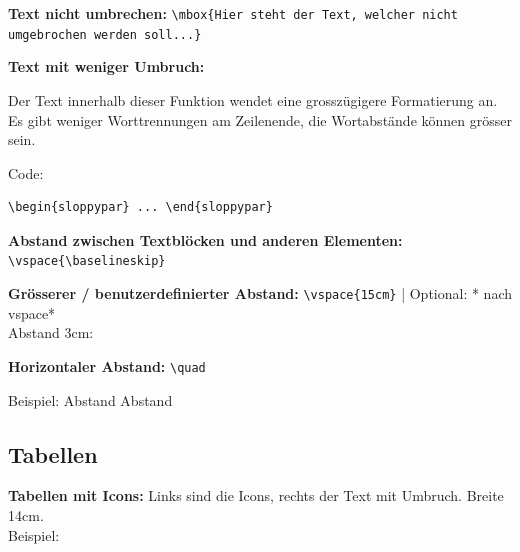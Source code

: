 \vspace{\baselineskip}

\textbf{Text nicht umbrechen:}
\verb+\mbox{Hier steht der Text, welcher nicht umgebrochen werden soll...}+

\vspace{\baselineskip}

\textbf{Text mit weniger Umbruch:}

Der Text innerhalb dieser Funktion wendet eine grosszügigere Formatierung an. Es gibt weniger Worttrennungen am Zeilenende, die Wortabstände können grösser sein.

Code:

\begin{verbatim}
\begin{sloppypar} ... \end{sloppypar}
\end{verbatim}

\vspace{\baselineskip}

\textbf{Abstand zwischen Textblöcken und anderen Elementen:}\\
\verb+\vspace{\baselineskip}+

\vspace{\baselineskip}

\textbf{Grösserer / benutzerdefinierter Abstand:} \verb+\vspace{15cm}+ | Optional: * nach vspace*\\

Abstand 3cm:
\vspace{3cm}


\textbf{Horizontaler Abstand:} \verb+\quad+

Beispiel: \quad Abstand \quad Abstand





\pagebreak
\subsection{Tabellen}

\textbf{Tabellen mit Icons:}
Links sind die Icons, rechts der Text mit Umbruch. Breite 14cm.\\

Beispiel:\\

